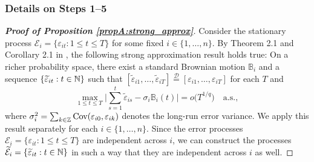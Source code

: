 \documentclass[12pt]{article}
\begin{document}
\subsubsection*{Details on Steps 1--5}


\begin{proof}[\textnormal{\textbf{Proof of Proposition \ref{propA:strong_approx}}}] 
Consider the stationary process $\mathcal{E}_i = \{\varepsilon_{it}: 1 \leq t \leq T\}$ for some fixed $i \in \{1,\ldots,n\}$. By Theorem 2.1 and Corollary 2.1 in \cite{BerkesLiuWu2014}, the following strong approximation result holds true: On a richer probability space, there exist a standard Brownian motion $\mathbb{B}_i$ and a sequence $\{ \widetilde{\varepsilon}_{it}: t \in \mathbb{N} \}$ such that $[\widetilde{\varepsilon}_{i1},\ldots,\widetilde{\varepsilon}_{iT}] \stackrel{\mathcal{D}}{=} [\varepsilon_{i1},\ldots,\varepsilon_{iT}]$ for each $T$ and 
\begin{equation}\label{eq-strongapprox-dep}
\max_{1 \le t \le T} \Big| \sum\limits_{s=1}^t \widetilde{\varepsilon}_{is} - \sigma_i \mathbb{B}_i(t) \Big| = o\big( T^{1/q} \big) \quad \text{a.s.},  
\end{equation}
where $\sigma^2_i = \sum_{k \in \mathbb{Z}} \textnormal{Cov}(\varepsilon_{i0}, \varepsilon_{ik})$ denotes the long-run error variance. We apply this result separately for each $i \in \{1,\ldots,n\}$. Since the error processes $\mathcal{E}_i = \{\varepsilon_{it}: 1 \leq t \leq T\}$ are independent across $i$, we can construct the processes $\widetilde{\mathcal{E}}_i = \{\widetilde{\varepsilon}_{it}: t\in \mathbb{N}\}$ in such a way that they are independent across $i$ as well. 



\end{proof}
\end{document}
